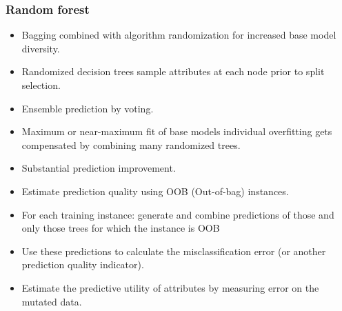 \documentclass{beamer}
\begin{document}
\begin{frame}
\small
\frametitle{Random forest}
\begin{block}{}
\begin{itemize}
\item Bagging combined with algorithm randomization for increased base model diversity.
\item Randomized decision trees sample attributes at each node prior to split selection.
\item Ensemble prediction by voting.
\item Maximum or near-maximum fit of base models individual overfitting gets compensated by combining many randomized trees.
\item Substantial prediction improvement.
\item Estimate prediction quality using OOB (Out-of-bag) instances.
\item For each training instance: generate and combine predictions of those and only those trees for which the instance is OOB
\item Use these predictions to calculate the misclassification error (or another prediction quality indicator).
\item Estimate the predictive utility of attributes by measuring error on the mutated data.
\end{itemize}
\end{block}
\end{frame}

\end{document}
